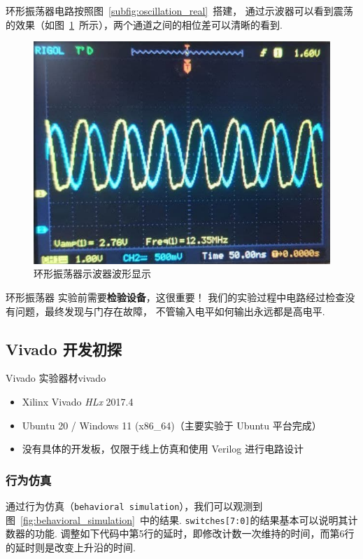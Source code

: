 \documentclass[fontset=windows,11pt]{SEU-Digital-Report}
\begin{document}
            环形振荡器电路按照图~\ref{subfig:oscillation_real}~搭建，
            通过示波器可以看到震荡的效果（如图~\ref{fig:two_waves}~所示），两个通道之间的相位差可以清晰的看到.

            \begin{figure}[htbp]
                \centering
                \includegraphics[width=.4\linewidth]{fig/two_waves.jpg}
                \caption{环形振荡器示波器波形显示}
                \label{fig:two_waves}
            \end{figure}

            \begin{note}{环形振荡器}{}
                实验前需要\textbf{检验设备}，这很重要！
                我们的实验过程中电路经过检查没有问题，最终发现与门存在故障，
                不管输入电平如何输出永远都是高电平.
            \end{note}

        \subsection{Vivado 开发初探}

            \begin{device}{Vivado 实验器材}{vivado}
                \begin{itemize}
                    \item Xilinx Vivado \textit{HLx} 2017.4
                    \item Ubuntu 20 / Windows 11 (x86\_64){\kaishu\color{gray}（主要实验于 Ubuntu 平台完成）}
                    \item 没有具体的开发板，仅限于线上仿真和使用 Verilog 进行电路设计
                \end{itemize}
            \end{device}

            \subsubsection{行为仿真}

                通过行为仿真（\texttt{behavioral simulation}），我们可以观测到图~\ref{fig:behavioral_simulation}~中的结果.
                \texttt{switches[7:0]}的结果基本可以说明其计数器的功能.
                调整如下代码中第5行的延时，即修改计数一次维持的时间，而第6行的延时则是改变上升沿的时间.
\end{document}

